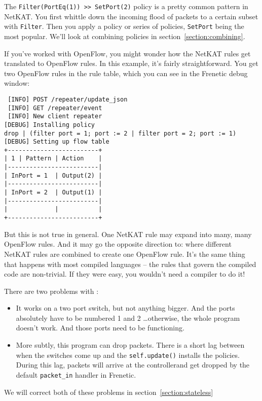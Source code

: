 The \texttt{Filter(PortEq(1)) >> SetPort(2)} policy is a pretty common pattern in NetKAT.
You first whittle down the incoming flood of packets to a certain subset with \texttt{Filter}.
Then you apply a policy or series of policies, \texttt{SetPort} being the most popular.
We'll look at combining policies in section~\ref{section:combining}.

If you've worked with OpenFlow, you might wonder how the NetKAT rules get translated to OpenFlow rules.
In this example, it's fairly straightforward.
You get two OpenFlow rules in the rule table, which you can see in the Frenetic debug window:

\begin{verbatim}
 [INFO] POST /repeater/update_json
 [INFO] GET /repeater/event
 [INFO] New client repeater
[DEBUG] Installing policy
drop | (filter port = 1; port := 2 | filter port = 2; port := 1)
[DEBUG] Setting up flow table
+-------------------------+
| 1 | Pattern | Action    |
|-------------------------|
| InPort = 1  | Output(2) |
|-------------------------|
| InPort = 2  | Output(1) |
|-------------------------|
|             |           |
+-------------------------+
\end{verbatim}

But this is not true in general.  
One NetKAT rule may expand into many, many OpenFlow rules.
And it may go the opposite direction to: where different NetKAT rules are combined to create one OpenFlow rule.
It's the same thing that happens with most compiled languages -- the rules that govern the compiled code
are non-trivial. 
If they were easy, you wouldn't need a compiler to do it!

There are two problems with :

\begin{itemize}
  \item It works on a two port switch, but not anything bigger.  
  And the ports absolutely have
  to be numbered 1 and 2 \ldots otherwise, the whole program doesn't work.
  And those ports need to be functioning.
  \item More subtly, this program can drop packets.  
  There is a short lag between when the switches come up and the \texttt{self.update()} installs
  the policies. 
  During this lag, packets will arrive at the controllerand get dropped by the 
  default \texttt{packet\_in} handler in Frenetic.   
\end{itemize}

We will correct both of these problems in section~\ref{section:stateless}

